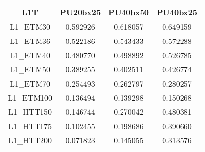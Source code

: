 
\begin{tabular}{|c||c|c|c|}
\hline
L1T & PU20bx25 & PU40bx50 & PU40bx25 \\
\hline \hline
L1\_ETM30 & 0.592926 & 0.618057 & 0.649159 \\
L1\_ETM36 & 0.522186 & 0.543433 & 0.572288 \\
L1\_ETM40 & 0.480770 & 0.498892 & 0.526785 \\
L1\_ETM50 & 0.389255 & 0.402511 & 0.426774 \\
L1\_ETM70 & 0.254493 & 0.262797 & 0.280257 \\
L1\_ETM100 & 0.136494 & 0.139298 & 0.150268 \\
L1\_HTT150 & 0.146744 & 0.270042 & 0.480381 \\
L1\_HTT175 & 0.102455 & 0.198686 & 0.390660 \\
L1\_HTT200 & 0.071823 & 0.145055 & 0.313576 \\
\hline
\end{tabular}

